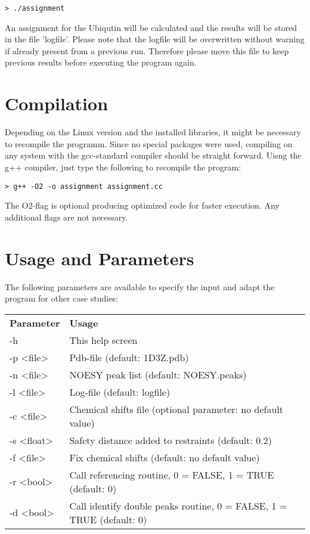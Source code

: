 \documentclass{scrartcl}
\begin{document}
\begin{verbatim}
> ./assignment 
\end{verbatim}

An assignment for the Ubiqutin will be calculated and the results will be stored in the file 'logfile'. Please note that the logfile will be overwritten without warning if already present from a previous run. Therefore please move this file to keep previous results before executing the program again.

\section{Compilation}
Depending on the Linux version and the installed libraries, it might be necessary to recompile the programm. Since no special packages were used, compiling on any system with the gcc-standard compiler should be straight forward. Uisng the g++ compiler, just type the following to recompile the program: 

\begin{verbatim}
> g++ -O2 -o assignment assignment.cc 
\end{verbatim}

The O2-flag is optional producing optimized code for faster execution. Any additional flags are not necessary. 

\section{Usage and Parameters}
The following parameters are available to specify the input and adapt the program for other case studies:
\begin{table}[htbp]
\begin{center}
\begin{tabular}{ll}
\textbf{Parameter} & \textbf{Usage} \\
-h  		& This help screen \\
-p <file>   & Pdb-file (default: 1D3Z.pdb) \\
-n <file>   & NOESY peak list (default: NOESY.peaks) \\
-l <file>   & Log-file (default: logfile) \\
-c <file>   & Chemical shifts file (optional parameter: no default value) \\
-s <float>  & Safety distance added to restraints (default: 0.2) \\
-f <file>   & Fix chemical shifts (default: no default value) \\
-r <bool>   & Call referencing routine, 0 = FALSE, 1 = TRUE (default: 0) \\
-d <bool>   & Call identify double peaks routine, 0 = FALSE, 1 = TRUE (default: 0) \\
\end{tabular}
\end{center}
\end{table}
\end{document}
